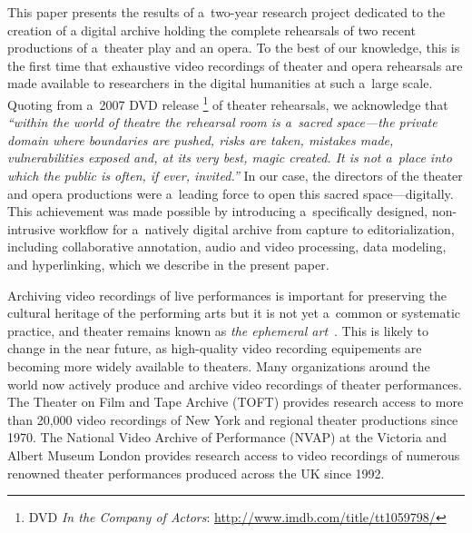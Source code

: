 \documentclass[conference]{IEEEtran}
\newcommand{\todo}[1]{\noindent\textcolor{red}{{\bf \{ToDo} #1{\bf \}}}}
\begin{document}
This paper presents the results of a~two-year research project dedicated to the creation of a digital archive holding the complete rehearsals of two recent productions of a~theater play and an opera. To the best of our knowledge, this is the first time that exhaustive video recordings of theater and opera rehearsals are made available to researchers in the digital humanities at such a~large scale. Quoting from a~2007 DVD release%
\footnote{DVD \emph{In the Company of Actors}: \url{http://www.imdb.com/title/tt1059798/}}
of theater rehearsals, we acknowledge that  {\em ``within the world of theatre the rehearsal room is a~sacred space---the private domain where boundaries are pushed, risks are taken, mistakes made, vulnerabilities exposed and, at its very best, magic created. It is not a~place into which the public is often, if ever, invited.''} In our case, the directors of the theater and opera productions were a~leading force to open this sacred space---digitally.  This achievement was made possible by introducing a~specifically designed, non-intrusive workflow for a~natively digital archive from capture to editorialization, including collaborative annotation, audio and video processing, data modeling,  and hyperlinking, which we describe in the present paper.






Archiving video recordings of live performances is important for preserving the cultural heritage of the performing arts but it is not yet a~common or systematic practice, and theater remains known as {\em the ephemeral art}~\cite{Reason06,Bouchez07}. This is likely to change in the near future, as high-quality video recording equipements are becoming more widely available to theaters.   Many organizations around the world now actively produce and archive video recordings of theater performances. The Theater on Film and Tape Archive (TOFT) provides research access to more than 20,000 video recordings of New York and regional theater productions since 1970.  The National Video Archive of Performance (NVAP) at the Victoria and Albert Museum London provides research access to video recordings of numerous renowned theater performances produced across the UK since 1992. 
\end{document}
